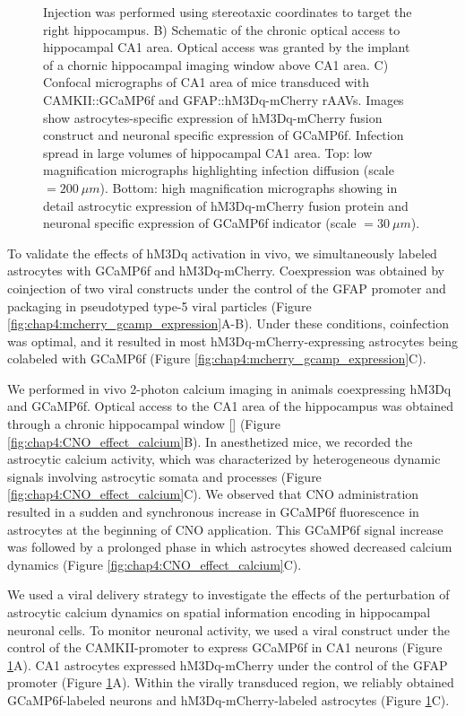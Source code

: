 \begin{figure}[h!]
{    Injection was performed using stereotaxic coordinates to target the right hippocampus. 
    B) Schematic of the chronic optical access to hippocampal CA1 area. 
    Optical access was granted by the implant of a chornic hippocampal imaging window above CA1 area. 
    C) Confocal micrographs of CA1 area of mice transduced with CAMKII::GCaMP6f and GFAP::hM3Dq-mCherry rAAVs. 
    Images show astrocytes-specific expression of hM3Dq-mCherry fusion construct and neuronal specific expression of GCaMP6f. 
    Infection spread in large volumes of hippocampal CA1 area. 
    Top: low magnification micrographs highlighting infection diffusion (scale $= 200\ \mu m$). 
    Bottom: high magnification micrographs showing in detail astrocytic expression of hM3Dq-mCherry fusion protein and neuronal specific expression of GCaMP6f indicator (scale $= 30\ \mu m$).}
    \label{fig:chap4:Pedro_fig5}
\end{figure}

To validate the effects of hM3Dq activation in vivo, we simultaneously labeled astrocytes with GCaMP6f and hM3Dq-mCherry. 
Coexpression was obtained by coinjection of two viral constructs under the control of the GFAP promoter and packaging in pseudotyped type-5 viral particles (Figure \ref{fig:chap4:mcherry_gcamp_expression}A-B). 
Under these conditions, coinfection was optimal, and it resulted in most hM3Dq-mCherry-expressing astrocytes being colabeled with GCaMP6f (Figure \ref{fig:chap4:mcherry_gcamp_expression}C).

We performed in vivo 2-photon calcium imaging in animals coexpressing hM3Dq and GCaMP6f. 
Optical access to the CA1 area of the hippocampus was obtained through a chronic hippocampal window [\cite{dombeck2010}] (Figure \ref{fig:chap4:CNO_effect_calcium}B). 
In anesthetized mice, we recorded the astrocytic calcium activity, which was characterized by heterogeneous dynamic signals involving astrocytic somata and processes (Figure \ref{fig:chap4:CNO_effect_calcium}C). 
We observed that CNO administration resulted in a sudden and synchronous increase in GCaMP6f fluorescence in astrocytes at the beginning of CNO application. 
This GCaMP6f signal increase was followed by a prolonged phase in which astrocytes showed decreased calcium dynamics (Figure \ref{fig:chap4:CNO_effect_calcium}C).

We used a viral delivery strategy to investigate the effects of the perturbation of astrocytic calcium dynamics on spatial information encoding in hippocampal neuronal cells. 
To monitor neuronal activity, we used a viral construct under the control of the CAMKII-promoter to express GCaMP6f in CA1 neurons (Figure \ref{fig:chap4:Pedro_fig5}A). 
CA1 astrocytes expressed hM3Dq-mCherry under the control of the GFAP promoter (Figure \ref{fig:chap4:Pedro_fig5}A). 
Within the virally transduced region, we reliably obtained GCaMP6f-labeled neurons and hM3Dq-mCherry-labeled astrocytes (Figure \ref{fig:chap4:Pedro_fig5}C).

